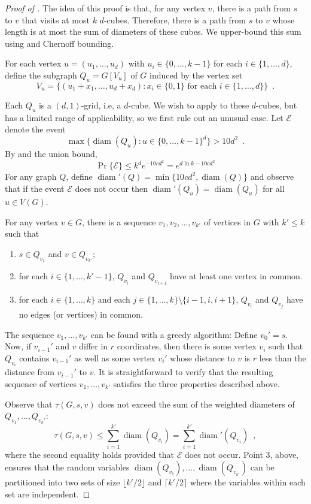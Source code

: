 \documentclass{patmorin}
\DeclareMathOperator{\diam}{diam}
\begin{document}
\begin{proof}[Proof of ]
The idea of this proof is that, for any vertex $v$, there is a path
from $s$ to $v$ that visits at most $k$ $d$-cubes. Therefore, there is
a path from $s$ to $v$ whose length is at most the sum of diameters
of these cubes.  We upper-bound this sum using 
and Chernoff bounding.

For each vertex $u=(u_1,\ldots,u_d)$ with $u_i\in\{0,\ldots,k-1\}$
for each $i\in\{1,\ldots,d\}$, define the subgraph
$Q_u=G[V_u]$ of $G$ induced by the vertex set
\[
    V_u = \{(u_1+x_1,\ldots,u_d+x_d) :\text{$x_i\in\{0,1\}$ for each $i\in\{1,\ldots,d\}$}\} \enspace .
\]

Each $Q_u$ is a $(d,1)$-grid, i.e, a $d$-cube.  We wish to apply
 to these $d$-cubes, but  has
a limited range of applicability, so we first rule out an unusual case.
Let $\mathcal{E}$ denote the event
\[
    \max\{\diam(Q_u) : u\in \{0,\ldots,k-1\}^d \} > 10d^2 \enspace .
\]
By  and the union bound,
\[
    \Pr\{\mathcal{E}\} \le k^de^{-10cd^2} = e^{d\ln k - 10cd^2}
\]
For any graph $Q$, define $\diam'(Q) = \min\{10cd^2, \diam(Q)\}$
and observe that if the event $\mathcal{E}$ does not occur then
$\diam'(Q_u)=\diam(Q_u)$ for all $u\in V(G)$.

For any vertex $v\in G$, there is a sequence $v_1,v_2,\ldots,v_{k'}$
of vertices in $G$ with $k'\le k$ such that
\begin{enumerate}
  \item $s\in Q_{v_1}$ and $v\in Q_{v_{k'}}$; 
  \item for each $i\in\{1,\ldots,k'-1\}$, $Q_{v_{i}}$ and $Q_{v_{i+1}}$ have at least one
vertex in common.
  \item for each $i\in\{1,\ldots,k\}$ and each $j\in\{1,\ldots,k\}\setminus\{i-1,i,i+1\}$, $Q_{v_i}$ and $Q_{v_j}$ have no edges (or vertices) in common.
\end{enumerate}
The sequence $v_1,\ldots,v_{k'}$ can be found with a greedy algorithm:
Define $v_0'=s$.  Now, if $v_{i-1}'$ and $v$ differ in $r$ coordinates,
then there is some vertex $v_i$ such that $Q_{v_i}$ contains $v_{i-1}'$
as well as some vertex $v_i'$ whose distance to $v$ is $r$ less than
the distance from $v_{i-1}'$ to $v$. It is straightforward to verify
that the resulting sequence of vertices $v_1,\ldots,v_{k'}$ satisfies
the three properties described above.

Observe that $\tau(G,s,v)$ does not exceed the sum of the weighted diameters of
$Q_{v_1},\ldots,Q_{v_k'}$:
\[
   \tau(G,s,v) \le \sum_{i=1}^{k'} \diam(Q_{v_i}) 
               = \sum_{i=1}^{k'} \diam'(Q_{v_i}) \enspace ,
\]
where the second equality holds provided that $\mathcal{E}$ does not occur.
Point 3, above, ensures that the random variables
$\diam(Q_{v_1}),\ldots,\diam(Q_{v_{k'}})$ can be partitioned into two
sets of size $\lfloor k'/2\rfloor$ and $\lceil k'/2\rceil$
where the variables within each set are independent.


\end{proof}
\end{document}
